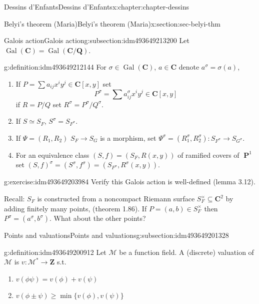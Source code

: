 \documentclass[oneside,10pt,]{book}
\numberwithin{equation}{section}
\newcommand{\lb}{[}
\newcommand{\rb}{]}
\newcommand{\ZZ}{\mathbf{Z}}
\newcommand{\QQ}{\mathbf{Q}}
\newcommand{\CC}{\mathbf{C}}
\newcommand{\Gal}[2]{\operatorname{Gal}(#1/#2)}
\DeclareMathOperator{\PP}{\mathbf{P}}
\begin{document}
\begin{chapterptx}{Dessins d'Enfants}{}{Dessins d'Enfants}{}{}{x:chapter:chapter-dessins}
\begin{sectionptx}{Belyi's theorem (Maria)}{}{Belyi's theorem (Maria)}{}{}{x:section:sec-belyi-thm}
%
\begin{subsectionptx}{Galois action}{}{Galois action}{}{}{g:subsection:idm493649213200}
Let \(\operatorname{Gal}(\CC) = \Gal{\CC}{\QQ}\).%
\begin{definition}{}{g:definition:idm493649212144}%
For \(\sigma \in \operatorname{Gal}(\CC)\), \(a\in \CC\) denote \(a^\sigma = \sigma(a)\),%
\begin{enumerate}
\item{}If \(P = \sum a_{ij} x^iy^j \in \CC\lb x,y\rb\) set%
\begin{equation*}
P^\sigma = \sum a^\sigma_{ij} x^iy^j \in \CC\lb x,y\rb
\end{equation*}
if \(R = P/Q\) set \(R^\sigma = P^\sigma / Q^\sigma\).%
\item{}If \(S \simeq S_F\), \(S^\sigma = S_{F^\sigma}\).%
\item{}If \(\Psi = (R_1, R_2)\) \(S_F\to S_G\) is a morphism, set \(\Psi^ \sigma = (R_1^\sigma , R_2 ^\sigma) \colon S_{F^\sigma} \to S_{G^\sigma}\).%
\item{}For an equivalence class \((S,f) = (S_F, R(x,y))\) of ramified covers of \(\PP^1\) set \((S,f)^\sigma = (S^\sigma, f^\sigma) = (S_{F^\sigma}, R^\sigma (x,y))\).%
\end{enumerate}
%
\end{definition}
\begin{inlineexercise}{}{g:exercise:idm493649203984}%
Verify this Galois action is well-defined (lemma 3.12).%
\end{inlineexercise}
Recall: \(S_F\) is    constructed from a noncompact Riemann surface \(S_F^\times \subseteq \CC^2\) by adding finitely many points, (theorem 1.86). If \(P=  (a,b) \in S_F^\times\) then \(P^\sigma = (a^\sigma, b^\sigma)\). What about the other points?%
\end{subsectionptx}
%
%
\typeout{************************************************}
\typeout{************************************************}
%
\begin{subsectionptx}{Points and valuations}{}{Points and valuations}{}{}{g:subsection:idm493649201328}
\begin{definition}{}{g:definition:idm493649200912}%
Let \(\mathcal M\) be a function field. A (discrete) valuation of \(\mathcal M\) is \(v \colon \mathcal M^* \to \ZZ\) s.t.%
\begin{enumerate}
\item{}\(\displaystyle v(\phi\psi) = v(\phi)  + v(\psi)\)%
\item{}\(\displaystyle v(\phi\pm\psi) \ge \min\{ v(\phi)  , v(\psi)\}\)%

\end{enumerate}
\end{definition}
\end{subsectionptx}
\end{sectionptx}
\end{chapterptx}
\end{document}
